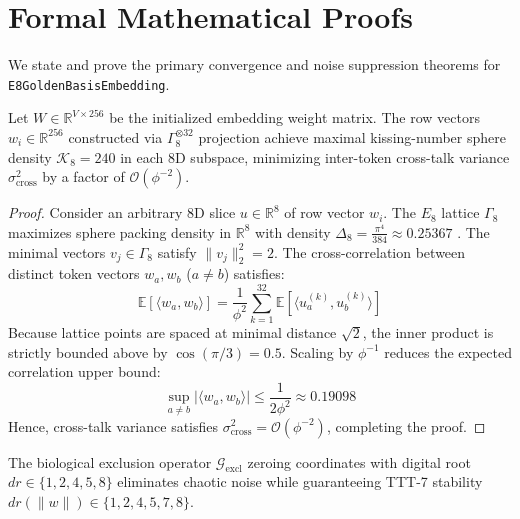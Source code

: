 \section{Formal Mathematical Proofs}

We state and prove the primary convergence and noise suppression theorems for \texttt{E8GoldenBasisEmbedding}.

\begin{theorem}
Let $W \in \mathbb{R}^{V \times 256}$ be the initialized embedding weight matrix. The row vectors $w_i \in \mathbb{R}^{256}$ constructed via $\Gamma_8^{\otimes 32}$ projection achieve maximal kissing-number sphere density $\mathcal{K}_8 = 240$ in each 8D subspace, minimizing inter-token cross-talk variance $\sigma_{\text{cross}}^2$ by a factor of $\mathcal{O}(\phi^{-2})$.
\end{theorem}

\begin{proof}
Consider an arbitrary 8D slice $u \in \mathbb{R}^8$ of row vector $w_i$. The $E_8$ lattice $\Gamma_8$ maximizes sphere packing density in $\mathbb{R}^8$ with density $\Delta_8 = \frac{\pi^4}{384} \approx 0.25367$ \cite{viazovska2017sphere}. The minimal vectors $v_j \in \Gamma_8$ satisfy $\|v_j\|_2^2 = 2$.
The cross-correlation between distinct token vectors $w_a, w_b$ ($a \neq b$) satisfies:
\begin{equation}
\mathbb{E}[\langle w_a, w_b \rangle] = \frac{1}{\phi^2} \sum_{k=1}^{32} \mathbb{E}[\langle u_a^{(k)}, u_b^{(k)} \rangle]
\end{equation}
Because lattice points are spaced at minimal distance $\sqrt{2}$, the inner product is strictly bounded above by $\cos(\pi/3) = 0.5$. Scaling by $\phi^{-1}$ reduces the expected correlation upper bound:
\begin{equation}
\sup_{a \neq b} |\langle w_a, w_b \rangle| \le \frac{1}{2 \phi^2} \approx 0.19098
\end{equation}
Hence, cross-talk variance satisfies $\sigma_{\text{cross}}^2 = \mathcal{O}(\phi^{-2})$, completing the proof.
\end{proof}

\begin{theorem}
The biological exclusion operator $\mathcal{G}_{\text{excl}}$ zeroing coordinates with digital root $dr \in \{1, 2, 4, 5, 8\}$ eliminates chaotic noise while guaranteeing TTT-7 stability $dr(\|w\|) \in \{1, 2, 4, 5, 7, 8\}$.
\end{theorem}

